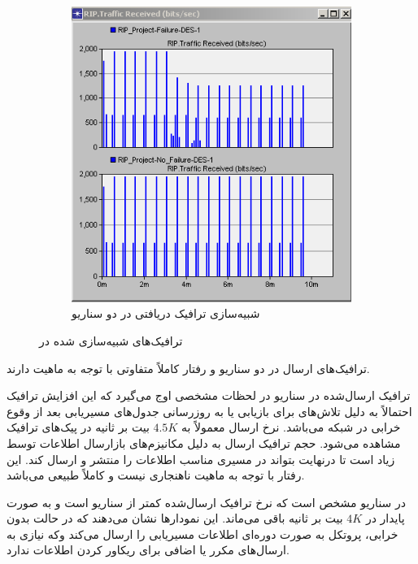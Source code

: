 \documentclass[a4paper]{article}
\begin{document}
\begin{enumerate}
\begin{figure}[h!]
\begin{subfigure}{0.45\textwidth}
            \includegraphics[width=\textwidth]{./figs/traffic_received.png}
            \caption{شبیه‌سازی ترافیک دریافتی در دو سناریو}
        \end{subfigure}
        \caption{ترافیک‌های شبیه‌سازی شده در }
    \end{figure}

    ترافیک‌های ارسال در دو سناریو  و  رفتار کاملاً
    متفاوتی با توجه به ماهیت  دارند.
    
    ترافیک ارسال‌شده در سناریو  در لحظات مشخصی اوج می‌گیرد که این
    افزایش ترافیک احتمالاً به دلیل تلاش‌های  برای بازیابی یا به روزرسانی
    جدول‌های مسیریابی بعد از وقوع خرابی در شبکه می‌باشد. نرخ ارسال معمولاً به
    $4.5K$ بیت بر ثانیه در پیک‌های ترافیک مشاهده می‌شود. حجم ترافیک ارسال به
    دلیل مکانیزم‌های باز‌ارسال اطلاعات توسط  زیاد است تا درنهایت بتواند
    در مسیری مناسب اطلاعات را منتشر و ارسال کند. این رفتار با توجه به ماهیت
     ناهنجاری نیست و کاملاً طبیعی می‌باشد.

    در سناریو  مشخص است که نرخ ترافیک ارسال‌شده کمتر از سناریو
     است و به صورت پایدار در $4K$ بیت بر ثانیه باقی می‌ماند. این
    نمودار‌ها نشان می‌دهند که در حالت بدون خرابی، پروتکل  به صورت
    دوره‌ای اطلاعات مسیریابی را ارسال می‌کند وکه نیازی به ارسال‌های مکرر یا
    اضافی برای ریکاور کردن اطلاعات ندارد.
    

\end{enumerate}
\end{document}

